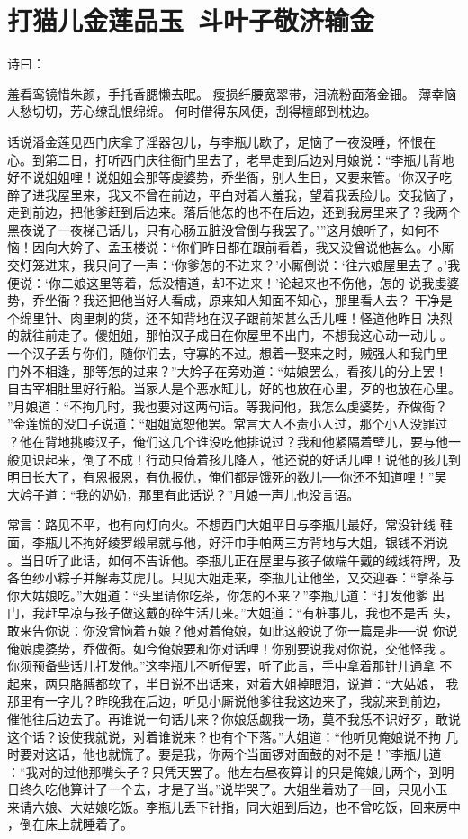 \chapter{打猫儿金莲品玉~斗叶子敬济输金}

诗曰：

羞看鸾镜惜朱颜，手托香腮懒去眠。
瘦损纤腰宽翠带，泪流粉面落金钿。
薄幸恼人愁切切，芳心缭乱恨绵绵。
何时借得东风便，刮得檀郎到枕边。

话说潘金莲见西门庆拿了淫器包儿，与李瓶儿歇了，足恼了一夜没睡，怀恨在
心。到第二日，打听西门庆往衙门里去了，老早走到后边对月娘说：“李瓶儿背地
好不说姐姐哩！说姐姐会那等虔婆势，乔坐衙，别人生日，又要来管。‘你汉子吃
醉了进我屋里来，我又不曾在前边，平白对着人羞我，望着我丢脸儿。交我恼了，
走到前边，把他爹赶到后边来。落后他怎的也不在后边，还到我房里来了？我两个
黑夜说了一夜梯己话儿，只有心肠五脏没曾倒与我罢了。’”这月娘听了，如何不
恼！因向大妗子、孟玉楼说：“你们昨日都在跟前看着，我又没曾说他甚么。小厮
交灯笼进来，我只问了一声：‘你爹怎的不进来？’小厮倒说：‘往六娘屋里去了
。’我便说：‘你二娘这里等着，恁没槽道，却不进来！’论起来也不伤他，怎的
说我虔婆势，乔坐衙？我还把他当好人看成，原来知人知面不知心，那里看人去？
干净是个绵里针、肉里刺的货，还不知背地在汉子跟前架甚么舌儿哩！怪道他昨日
决烈的就往前走了。傻姐姐，那怕汉子成日在你屋里不出门，不想我这心动一动儿
。一个汉子丢与你们，随你们去，守寡的不过。想着一娶来之时，贼强人和我门里
门外不相逢，那等怎的过来？”大妗子在旁劝道：“姑娘罢么，看孩儿的分上罢！
自古宰相肚里好行船。当家人是个恶水缸儿，好的也放在心里，歹的也放在心里。
”月娘道：“不拘几时，我也要对这两句话。等我问他，我怎么虔婆势，乔做衙？
”金莲慌的没口子说道：“姐姐宽恕他罢。常言大人不责小人过，那个小人没罪过
？他在背地挑唆汉子，俺们这几个谁没吃他排说过？我和他紧隔着壁儿，要与他一
般见识起来，倒了不成！行动只倚着孩儿降人，他还说的好话儿哩！说他的孩儿到
明日长大了，有恩报恩，有仇报仇，俺们都是饿死的数儿──你还不知道哩！”吴
大妗子道：“我的奶奶，那里有此话说？”月娘一声儿也没言语。

常言：路见不平，也有向灯向火。不想西门大姐平日与李瓶儿最好，常没针线
鞋面，李瓶儿不拘好绫罗缎帛就与他，好汗巾手帕两三方背地与大姐，银钱不消说
。当日听了此话，如何不告诉他。李瓶儿正在屋里与孩子做端午戴的绒线符牌，及
各色纱小粽子并解毒艾虎儿。只见大姐走来，李瓶儿让他坐，又交迎春：“拿茶与
你大姑娘吃。”大姐道：“头里请你吃茶，你怎的不来？”李瓶儿道：“打发他爹
出门，我赶早凉与孩子做这戴的碎生活儿来。”大姐道：“有桩事儿，我也不是舌
头，敢来告你说：你没曾恼着五娘？他对着俺娘，如此这般说了你一篇是非──说
你说俺娘虔婆势，乔做衙。如今俺娘要和你对话哩！你别要说我对你说，交他怪我
。你须预备些话儿打发他。”这李瓶儿不听便罢，听了此言，手中拿着那针儿通拿
不起来，两只胳膊都软了，半日说不出话来，对着大姐掉眼泪，说道：“大姑娘，
我那里有一字儿？昨晚我在后边，听见小厮说他爹往我这边来了，我就来到前边，
催他往后边去了。再谁说一句话儿来？你娘恁觑我一场，莫不我恁不识好歹，敢说
这个话？设使我就说，对着谁说来？也有个下落。”大姐道：“他听见俺娘说不拘
几时要对这话，他也就慌了。要是我，你两个当面锣对面鼓的对不是！”李瓶儿道
：“我对的过他那嘴头子？只凭天罢了。他左右昼夜算计的只是俺娘儿两个，到明
日终久吃他算计了一个去，才是了当。”说毕哭了。大姐坐着劝了一回，只见小玉
来请六娘、大姑娘吃饭。李瓶儿丢下针指，同大姐到后边，也不曾吃饭，回来房中
，倒在床上就睡着了。

